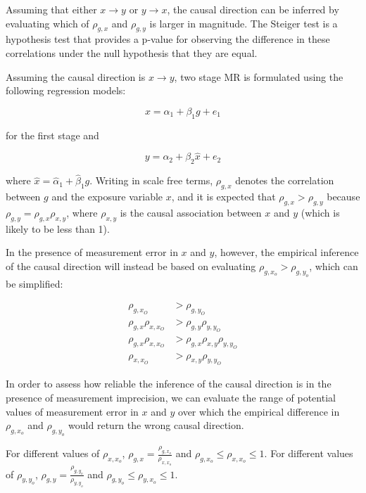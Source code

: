 \documentclass[]{article}
\begin{document}
Assuming that either \(x \rightarrow y\) or \(y \rightarrow x\), the
causal direction can be inferred by evaluating which of \(\rho_{g, x}\)
and \(\rho_{g, y}\) is larger in magnitude. The Steiger test is a
hypothesis test that provides a p-value for observing the difference in
these correlations under the null hypothesis that they are equal.

Assuming the causal direction is \(x \to y\), two stage MR is formulated
using the following regression models:

\[
x = \alpha_1 + \beta_1 g + e_1
\]

for the first stage and

\[
y = \alpha_2 + \beta_2 \hat{x} + e_2
\]

where \(\hat{x} = \hat{\alpha}_1 + \hat{\beta}_1 g\). Writing in scale
free terms, \(\rho_{g, x}\) denotes the correlation between \(g\) and
the exposure variable \(x\), and it is expected that
\(\rho_{g, x} > \rho_{g, y}\) because
\(\rho_{g, y} = \rho_{g, x}\rho_{x, y}\), where \(\rho_{x, y}\) is the
causal association between \(x\) and \(y\) (which is likely to be less
than 1).

In the presence of measurement error in \(x\) and \(y\), however, the
empirical inference of the causal direction will instead be based on
evaluating \(\rho_{g, x_o} > \rho_{g, y_o}\), which can be simplified:

\[
\begin{aligned}
\rho_{g, x_O} & > \rho_{g, y_O} \\
\rho_{g, x} \rho_{x, x_O} & > \rho_{g,y}\rho_{y,y_O}\\
\rho_{g, x} \rho_{x, x_O} & > \rho_{g,x}\rho_{x,y}\rho_{y,y_O}\\
\rho_{x, x_O} & > \rho_{x,y}\rho_{y,y_O}
\end{aligned}
\]

In order to assess how reliable the inference of the causal direction is
in the presence of measurement imprecision, we can evaluate the range of
potential values of measurement error in \(x\) and \(y\) over which the
empirical difference in \(\rho_{g, x_o}\) and \(\rho_{g, y_o}\) would
return the wrong causal direction.

For different values of \(\rho_{x,x_o}\),
\(\rho_{g,x} = \frac{\rho_{g, x_o}}{\rho_{x,x_o}}\) and
\(\rho_{g,x_o} \leq \rho_{x,x_o} \leq 1\). For different values of
\(\rho_{y,y_o}\), \(\rho_{g,y} = \frac{\rho_{g, y_o}}{\rho_{y,y_o}}\)
and \(\rho_{g,y_o} \leq \rho_{y,x_o} \leq 1\).
\end{document}
